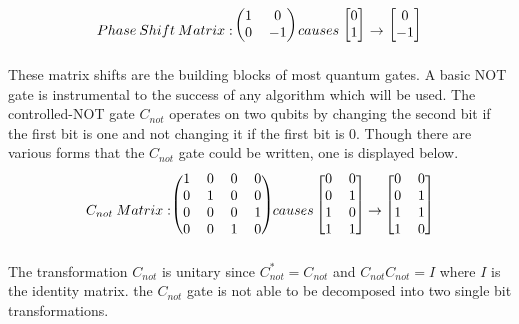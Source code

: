 \documentclass[12pt]{article}
\begin{document}
$$
Phase\:Shift\:Matrix: 
\begin{blockarray}{cc}
\begin{block}{(cc)}
1 & 0\\
0 & -1\\
\end{block}
\end{blockarray}
 \:causes\:
\begin{blockarray}{c}
\begin{block}{[c]}
0\\
1\\
\end{block}
\end{blockarray}
\rightarrow
\begin{blockarray}{c}
\begin{block}{[c]}
0\\
-1\\
\end{block}
\end{blockarray}
$$
These matrix shifts are the building blocks of most quantum gates. A basic NOT gate is instrumental to the success of any algorithm which will be used. The controlled-NOT gate $C_{not}$ operates on two qubits by changing the second bit if the first bit is one and not changing it if the first bit is 0. Though there are various forms that the $C_{not}$ gate could be written, one is displayed below.
$$
C_{not}\:Matrix: 
\begin{blockarray}{cccc}
\begin{block}{(cccc)}
1 & 0 & 0 & 0\\
0 & 1 & 0 & 0\\
0 & 0 & 0 & 1\\
0 & 0 & 1 & 0\\
\end{block}
\end{blockarray}
 \:causes\:
\begin{blockarray}{cc}
\begin{block}{[cc]}
0 & 0\\
0 & 1\\
1 & 0\\
1 & 1\\
\end{block}
\end{blockarray}
\rightarrow
\begin{blockarray}{cc}
\begin{block}{[cc]}
0 & 0\\
0 & 1\\
1 & 1\\
1 & 0\\
\end{block}
\end{blockarray}
$$
The transformation $C_{not}$ is unitary since $C^*_{not} = C_{not}$ and $C_{not}C_{not} = I$ where $I$ is the identity matrix. the $C_{not}$ gate is not able to be decomposed into two single bit transformations.\cite{non}\par
\end{document}
